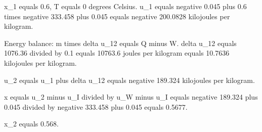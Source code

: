 x_1 equals 0.6, T equals 0 degrees Celsius.  
u_1 equals negative 0.045 plus 0.6 times negative 333.458 plus 0.045 equals negative 200.0828 kilojoules per kilogram.  

Energy balance:  
m times delta u_12 equals Q minus W.  
delta u_12 equals 1076.36 divided by 0.1 equals 10763.6 joules per kilogram equals 10.7636 kilojoules per kilogram.  

u_2 equals u_1 plus delta u_12 equals negative 189.324 kilojoules per kilogram.  

x equals u_2 minus u_I divided by u_W minus u_I equals negative 189.324 plus 0.045 divided by negative 333.458 plus 0.045 equals 0.5677.  

x_2 equals 0.568.